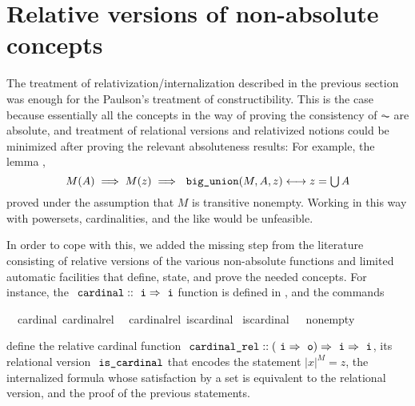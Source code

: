\section{Relative versions of non-absolute concepts}
\label{sec:relat-vers-non-absol}

The treatment of relativization/internalization described in the
previous section was enough for the Paulson's treatment of
constructibility. This is the case because essentially all the
concepts in the way of proving the consistency of $\AC$ are
absolute, and treatment of relational versions and relativized notions
could be minimized after proving the relevant absoluteness results:
For example, the lemma ,
\[
  M(A) \implies M(z) \implies \isatt{big{\uscore}union}(M, A, z) \longleftrightarrow z = \union
  A
\]
proved under the assumption that $M$ is transitive nonempty. Working in this
way with powersets, cardinalities, and the like would be
unfeasible.

In order to cope with this, we added the missing step from the
literature consisting of relative versions of the various non-absolute
functions and limited automatic facilities that define, state, and
prove the needed concepts. For instance, the 
$\isatt{cardinal}::\tyi \fun \tyi$ function is defined in
, and the commands
\begin{isabelle}
  \isamarkupfalse%
  \ \ {\isachardoublequoteopen}cardinal{\isachardoublequoteclose}\ {\isachardoublequoteopen}cardinal{\isacharunderscore}{\kern0pt}rel{\isachardoublequoteclose}\ \isanewline
  \isamarkupfalse%
  \ {\isachardoublequoteopen}cardinal{\isacharunderscore}{\kern0pt}rel{\isachardoublequoteclose}\ {\isachardoublequoteopen}is{\isacharunderscore}{\kern0pt}cardinal{\isachardoublequoteclose}\isanewline
  \isamarkupfalse%
  \ {\isachardoublequoteopen}is{\isacharunderscore}{\kern0pt}cardinal{\isachardoublequoteclose}\ \ \ {\isachardoublequoteopen}nonempty{\isachardoublequoteclose}%
\end{isabelle}
define the relative cardinal function
$\isatt{cardinal{\uscore}rel}::(\tyi \fun \tyo) \fun \tyi \fun\tyi$,
its relational version $\isatt{is{\uscore}cardinal}$ that encodes the
statement $|x|^M = z$, the
internalized formula  whose
satisfaction by a set is equivalent to the relational version, and the
proof of the previous statements.


